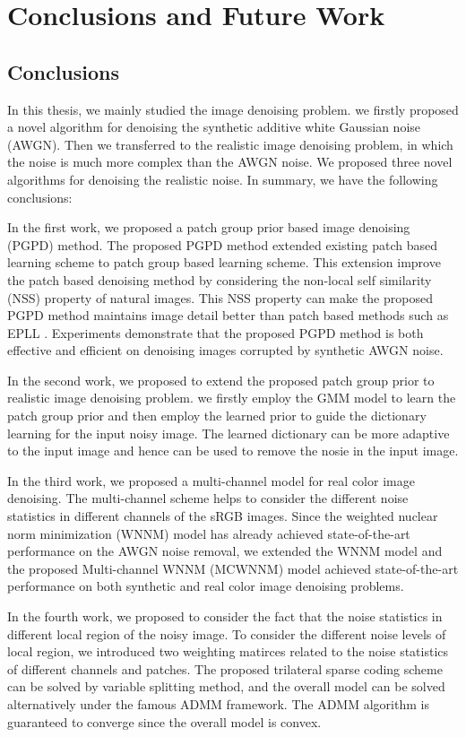 %
\chapter{Conclusions and Future Work}
\label{sec:conclusions}


\section{Conclusions}
\label{sec:conclusions:sec1}
In this thesis, we mainly studied the image denoising problem. we firstly proposed a novel algorithm for denoising the synthetic additive white Gaussian noise (AWGN). Then we transferred to the realistic image denoising problem, in which the noise is much more complex than the AWGN noise. We proposed three novel algorithms for denoising the realistic noise. In summary, we have the following conclusions:

In the first work, we proposed a patch group prior based image denoising (PGPD) method. The proposed PGPD method extended existing patch based learning scheme to patch group based learning scheme. This extension improve the patch based denoising method by considering the non-local self similarity (NSS) property of natural images. This NSS property can make the proposed PGPD method maintains image detail better than patch based methods such as EPLL \cite{epll}. Experiments demonstrate that the proposed PGPD method is both effective and efficient on denoising images corrupted by synthetic AWGN noise.

In the second work, we proposed to extend the proposed patch group prior to realistic image denoising problem. we firstly employ the GMM model to learn the patch group prior and then employ the learned prior to guide the dictionary learning for the input noisy image. The learned dictionary can be more adaptive to the input image and hence can be used to remove the nosie in the input image.

In the third work, we proposed a multi-channel model for real color image denoising. The multi-channel scheme helps to consider the different noise statistics in different channels of the sRGB images. Since the weighted nuclear norm minimization (WNNM) model has already achieved state-of-the-art performance on the AWGN noise removal, we extended the WNNM model and the proposed Multi-channel WNNM (MCWNNM) model achieved state-of-the-art performance on both synthetic and real color image denoising problems. 

In the fourth work, we proposed to consider the fact that the noise statistics in different local region of the noisy image. To consider the different noise levels of local region, we introduced two weighting matirces related to the noise statistics of different channels and patches. The proposed trilateral sparse coding scheme can be solved by variable splitting method, and the overall model can be solved alternatively under the famous ADMM framework. The ADMM algorithm is guaranteed to converge since the overall model is convex.

